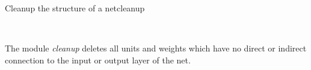\begin{moduledoc}{Cleanup the structure of a net}{cleanup}

  \item[\KeyWord{no parameters}]~\\
    
\end{moduledoc}

The module {\it cleanup} deletes all units and weights which have no direct or
indirect connection to the input or output layer of the net.
